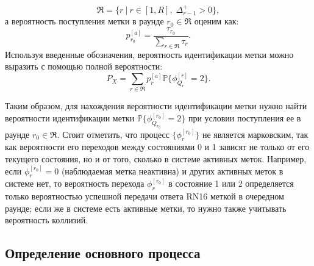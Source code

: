 $$
	\mathfrak{R} = \{ r\:|\:r \in [1, R],\; \Delta_{r-1}^+ > 0 \},
$$
а вероятность поступления метки в раунде $r_0 \in \mathfrak{R}$ оценим как:
\begin{equation}\label{eq:ch3_fg_prob_arrival}
	p^{[a]}_{r_0} = \frac{\tau_{r_0}}{\sum_{r \in \mathfrak{R}} \tau_r}.
\end{equation}
Используя введенные обозначения, вероятность идентификации метки можно выразить с помощью полной вероятности:
\begin{equation}\label{eq:ch3_tag_id_prob_phi}
	P_X = \sum\limits_{r \in \mathfrak{R}} p^{[a]}_r \mathbb{P}\{ \phi^{[r]}_{Q_r} = 2 \}.
\end{equation}

Таким образом, для нахождения вероятности идентификации метки нужно найти вероятности идентификации метки $\mathbb{P}\{ \phi^{[r_0]}_{Q_{r_0}} = 2 \}$ при условии поступления ее в раунде $r_0 \in \mathfrak{R}$. Стоит отметить, что процесс $\{ \phi^{[r_0]}_r \}$ не является марковским, так как вероятности его переходов между состояниями 0 и 1 зависят не только от его текущего состояния, но и от того, сколько в системе активных меток. Например, если $\phi_r^{[r_0]} = 0$ (наблюдаемая метка неактивна) и других активных меток в системе нет, то вероятность перехода $\phi_r^{[r_0]}$ в состояние 1 или 2 определяется только вероятностью успешной передачи ответа RN16 меткой в очередном раунде; если же в системе есть активные метки, то нужно также учитывать вероятность коллизий.



\subsection{Определение основного процесса}

